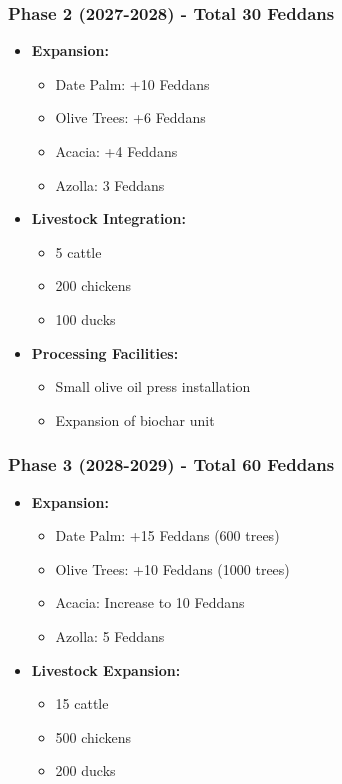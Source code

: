 \subsubsection{Phase 2 (2027-2028) - Total 30 Feddans}
\begin{itemize}
    \item \textbf{Expansion:}
    \begin{itemize}
        \item Date Palm: +10 Feddans
        \item Olive Trees: +6 Feddans
        \item Acacia: +4 Feddans
        \item Azolla: 3 Feddans
    \end{itemize}
    
    \item \textbf{Livestock Integration:}
    \begin{itemize}
        \item 5 cattle
        \item 200 chickens
        \item 100 ducks
    \end{itemize}
    
    \item \textbf{Processing Facilities:}
    \begin{itemize}
        \item Small olive oil press installation
        \item Expansion of biochar unit
    \end{itemize}
\end{itemize}

\subsubsection{Phase 3 (2028-2029) - Total 60 Feddans}
\begin{itemize}
    \item \textbf{Expansion:}
    \begin{itemize}
        \item Date Palm: +15 Feddans (600 trees)
        \item Olive Trees: +10 Feddans (1000 trees)
        \item Acacia: Increase to 10 Feddans
        \item Azolla: 5 Feddans
    \end{itemize}
    
    \item \textbf{Livestock Expansion:}
    \begin{itemize}
        \item 15 cattle
        \item 500 chickens
        \item 200 ducks
    \end{itemize}
\end{itemize}

